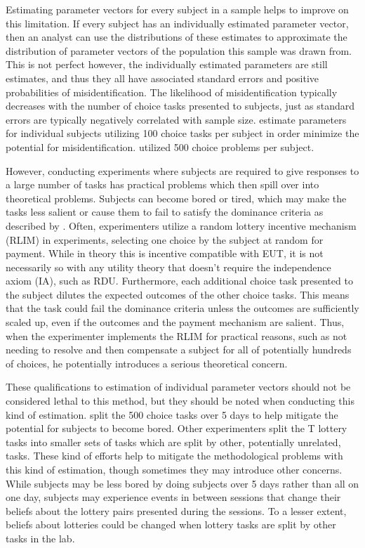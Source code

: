 \documentclass[../main.tex]{subfiles}
\begin{document}
Estimating parameter vectors for every subject in a sample helps to improve on this limitation.
If every subject has an individually estimated parameter vector, then an analyst can use the distributions of these estimates to approximate the distribution of parameter vectors of the population this sample was drawn from.
This is not perfect however, the individually estimated parameters are still estimates, and thus they all have associated standard errors and positive probabilities of misidentification.
The likelihood of misidentification typically decreases with the number of choice tasks presented to subjects, just as standard errors are typically negatively correlated with sample size.
\textcite{Hey1994} estimate parameters for individual subjects utilizing 100 choice tasks per subject in order minimize the potential for misidentification.
\textcite{Hey2001} utilized 500 choice problems per subject.

However, conducting experiments where subjects are required to give responses to a large number of tasks has practical problems which then spill over into theoretical problems.
Subjects can become bored or tired, which may make the tasks less salient or cause them to fail to satisfy the dominance criteria as described by \textcite{Harrison1992}.
Often, experimenters utilize a random lottery incentive mechanism (RLIM) in experiments, selecting one choice by the subject at random for payment.
While in theory this is incentive compatible with EUT, it is not necessarily so with any utility theory that doesn't require the independence axiom (IA), such as RDU.
Furthermore, each additional choice task presented to the subject dilutes the expected outcomes of the other choice tasks.
This means that the task could fail the dominance criteria unless the outcomes are sufficiently scaled up, even if the outcomes and the payment mechanism are salient.
Thus, when the experimenter implements the RLIM for practical reasons, such as not needing to resolve and then compensate a subject for all of potentially hundreds of choices, he potentially introduces a serious theoretical concern.

These qualifications to estimation of individual parameter vectors should not be considered lethal to this method, but they should be noted when conducting this kind of estimation.
\textcite{Hey2001} split the 500 choice tasks over 5 days to help mitigate the potential for subjects to become bored.
Other experimenters split the T lottery tasks into smaller sets of tasks which are split by other, potentially unrelated, tasks.
These kind of efforts help to mitigate the methodological problems with this kind of estimation, though sometimes they may introduce other concerns.
While subjects may be less bored by doing subjects over 5 days rather than all on one day, subjects may experience events in between sessions that change their beliefs about the lottery pairs presented during the sessions.
To a lesser extent, beliefs about lotteries could be changed when lottery tasks are split by other tasks in the lab.
\end{document}
